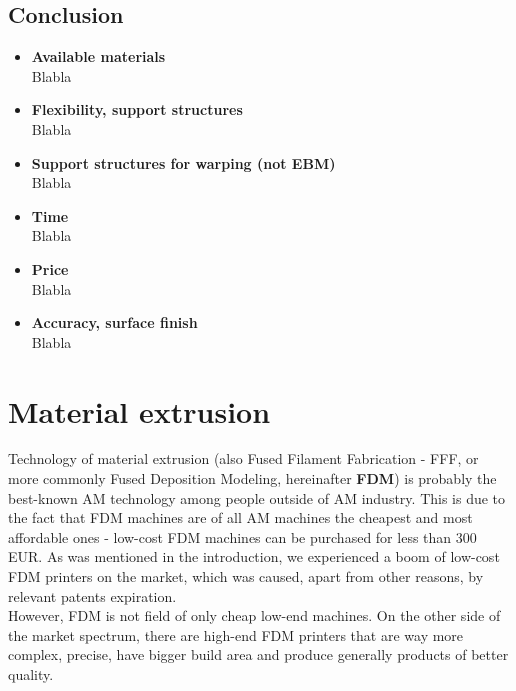 \documentclass[a4paper, twoside, 11pt]{report}
\newcommand\pro{\item[$+$]}
\newcommand\con{\item[$-$]}
\begin{document}
\section{Conclusion}
\begin{itemize}
\pro \textbf{Available materials}\\
Blabla


\pro \textbf{Flexibility, support structures}\\
Blabla
\\[10pt]

\con \textbf{Support structures for warping (not EBM)}\\
Blabla

\con \textbf{Time}\\
Blabla

\con \textbf{Price}\\
Blabla

\con \textbf{Accuracy, surface finish}\\
Blabla
\end{itemize}




\chapter{Material extrusion}
Technology of material extrusion (also Fused Filament Fabrication - FFF, or more commonly Fused Deposition Modeling, hereinafter \textbf{FDM}) is probably the best-known AM technology among people outside of AM industry. This is due to the fact that FDM machines are of all AM machines the cheapest and most affordable ones - low-cost FDM machines can be purchased for less than 300 EUR. As was mentioned in the introduction, we experienced a boom of low-cost FDM printers on the market, which was caused, apart from other reasons, by relevant patents expiration.\\
	However, FDM is not field of only cheap low-end machines. On the other side of the market spectrum, there are high-end FDM printers that are way more complex, precise, have bigger build area and produce generally products of better quality.
\end{document}
